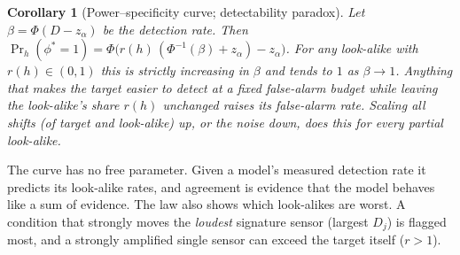 \documentclass{article}
\newtheorem{corollary}[theorem]{Corollary}
\theoremstyle{definition}
\theoremstyle{remark}
\renewcommand{\1}{\mathbf{1}}
\begin{document}
\begin{corollary}[Power--specificity curve; detectability paradox]\label{cor:paradox}
Let $\beta=\Phi(D-z_\alpha)$ be the detection rate. Then $\Pr_h(\phi^*=1)=\Phi\big(r(h)\,(\Phi^{-1}(\beta)+z_\alpha)-z_\alpha\big)$. For any look-alike with $r(h)\in(0,1)$ this is strictly increasing in $\beta$ and tends to $1$ as $\beta\to1$. Anything that makes the target easier to detect at a fixed false-alarm budget while leaving the look-alike's share $r(h)$ unchanged raises its false-alarm rate. Scaling all shifts (of target and look-alike) up, or the noise down, does this for \emph{every} partial look-alike.
\end{corollary}
The curve has no free parameter. Given a model's measured detection rate it predicts its look-alike rates, and agreement is evidence that the model behaves like a sum of evidence. The law also shows which look-alikes are worst. A condition that strongly moves the \emph{loudest} signature sensor (largest $D_j$) is flagged most, and a strongly amplified single sensor can exceed the target itself ($r>1$).
\end{document}
